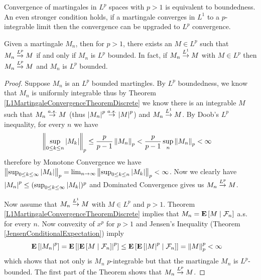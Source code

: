 Convergence of martingales in $L^p$ spaces with $p > 1$ is equivalent
to boundedness.  An even stronger condition holds, if a martingale
converges in $L^1$ to a $p$-integrable limit then the convergence can
be upgraded to $L^p$ convergence.
\begin{thm}\label{LpMartingaleConvergenceDiscrete}Given a
  martingale $M_n$, then for $p > 1$, there exists an $M \in L^p$ such that $M_n
  \tolp{p} M$ if and only if $M_n$ is $L^p$ bounded.  In fact, if $M_n
  \tolp{1} M$ with $M \in L^p$ then $M_n \tolp{p} M$ and $M_n$
  is $L^p$ bounded.
\end{thm}
\begin{proof}
Suppose $M_n$ is an $L^p$ bounded martingles.  By $L^p$ boundedness,
we know that $M_n$ is uniformly integrable thus by Theorem
\ref{L1MartingaleConvergenceTheoremDiscrete}
we know there is an integrable $M$ such that $M_n \toas M$ (thus $\abs{M_n}^p \toas \abs{M}^p$) and $M_n
\tolp{1} M$.  By Doob's $L^p$ inequality, for every $n$ we have
\begin{align*}
\norm{\sup_{0 \leq k \leq n} \abs{M_k}}_p &\leq \frac{p}{p-1} \norm{M_n}_p <
\frac{p}{p-1} \sup_n \norm{M_n}_p < \infty
\end{align*}
therefore by Monotone
Convergence we have $\norm{\sup_{0 \leq k \leq \infty} \abs{M_k}}_p = \lim_{n
  \to \infty}\norm{\sup_{0 \leq k \leq n} \abs{M_k}}_p < \infty$.  Now we
clearly have $\abs{M_n}^p \leq (\sup_{0 \leq k \leq \infty} \abs{M_k})^p$ and
Dominated Convergence gives us $M_n \tolp{p} M$.

Now assume that $M_n \tolp{1} M$ with $M \in L^p$ and $p > 1$. Theorem \ref{L1MartingaleConvergenceTheoremDiscrete}
implies that $M_n = \cexpectationlong{\mathcal{F}_n}{M}$ a.s. for
every $n$.  Now convexity of $x^p$ for $p > 1$ and  Jensen's
Inequality (Theorem \ref{JensenConditionalExpectation}) imply
\begin{align*}
\expectation{\abs{M_n}^p} &=
\expectation{\abs{\cexpectationlong{\mathcal{F}_n}{M}}^p} \leq 
\expectation{\cexpectationlong{\mathcal{F}_n}{\abs{M}^p}} =
\norm{M}_p^p < \infty
\end{align*}
which shows that not only is $M_n$ $p$-integrable but that the
martingale $M_n$ is
$L^p$-bounded.  The first part of the Theorem shows that $M_n \tolp{p} M$.
\end{proof}

